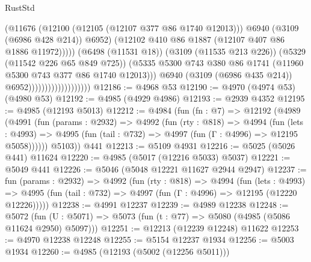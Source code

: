 \begin{lexlean}{RustStd}
\begin{coremodule}
                                                  (@11676
                                                    (@12100 (@12105 (@12107 @377 @86 @1740 @12013)))
                                                    @6940
                                                    (@3109 (@6986 @428 @214))
                                                    @6952)
                                                  (@12102
                                                    @410
                                                    @86
                                                    @1887
                                                    (@12107 @407 @86 @1886 @11972)))))
                                            (@6498 (@11531 @18))
                                            (@3109 (@11535 @213 @226))
                                            (@5329 (@11542 @226 @65 @849 @725))
                                            (@5335
                                              @5300
                                              @743
                                              @380
                                              @86
                                              @1741
                                              (@11960 @5300 @743 @377 @86 @1740 @12013)))
                                          @6940
                                          (@3109 (@6986 @435 @214))
                                          @6952)))))))))))))))))))
@12186 := @4968 @53
@12190 := @4970 (@4974 @53) (@4980 @53)
@12192 := @4985 (@4929 @4986)
@12193 := @2939 @4352
@12195 := @4985 (@12193 @5013)
@12212 := @4984
    (fun (fn : @7) =>
    @12192
      (@4989
        (@4991
          (fun (params : @2932) =>
          @4992
            (fun (rty : @818) =>
            @4994
              (fun (lets : @4993) =>
              @4995 (fun (tail : @732) => @4997 (fun (Γ : @4996) => @12195 @5058))))))
        @5103))
    @441
@12213 := @5109 @4931
@12216 := @5025 (@5026 @441) @11624
@12220 := @4985 (@5017 (@12216 @5033) @5037)
@12221 := @5049 @441
@12226 := @5046 (@5048 @12221 @11627 @2944 @2947)
@12237 := fun (params : @2932) =>
  @4992
    (fun (rty : @818) =>
    @4994
      (fun (lets : @4993) =>
      @4995 (fun (tail : @732) => @4997 (fun (Γ : @4996) => @12195 (@12220 @12226)))))
@12238 := @4991 @12237
@12239 := @4989 @12238
@12248 := @5072
    (fun (U : @5071) => @5073 (fun (t : @77) => @5080 (@4985 (@5086 @11624 @2950) @5097)))
@12251 := @12213 (@12239 @12248) @11622
@12253 := @4970 @12238 @12248
@12255 := @5154 @12237 @1934
@12256 := @5003 @1934
@12260 := @4985 (@12193 (@5002 (@12256 @5011)))

\end{coremodule}
\end{lexlean}
